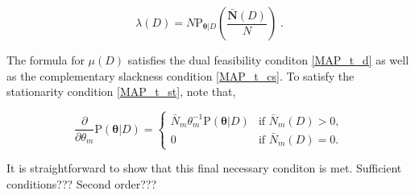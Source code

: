 \documentclass[12pt]{article}
\begin{document}
\begin{equation}
\lambda(D) =  N \text{P}_{\bm{\theta} | D} \left( \frac{\bar{\bm{N}}(D)}{N} \right) \;.
\end{equation}

The formula for $\mu(D)$ satisfies the dual feasibility conditon \eqref{MAP_t_d} as well as the complementary slackness condition \eqref{MAP_t_cs}. To satisfy the stationarity condition \eqref{MAP_t_st}, note that,

\begin{equation}
\frac{\partial}{\partial \theta_m} \text{P}(\bm{\theta} | D) = \begin{cases} \bar{N}_m \theta_m^{-1} \text{P}(\bm{\theta} | D) & \text{if } \bar{N}_m(D) > 0, \\ 0 & \text{if } \bar{N}_m(D) = 0. \end{cases}
\end{equation}

It is straightforward to show that this final necessary conditon is met. Sufficient conditions??? Second order???

\end{document}
